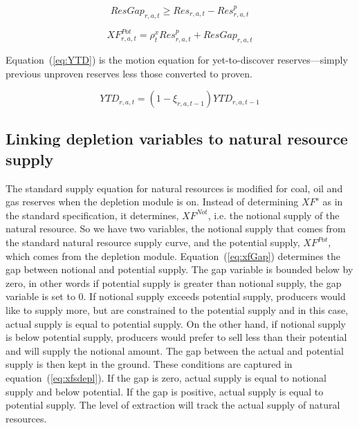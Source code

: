 \documentclass[11pt,letterpaper]{report}
\begin{document}
\begin{equation}
\label{eq:resGap}
\mathit{ResGap}_{r,a,t} \ge \mathit{Res}_{r,a,t} - \mathit{Res}^p_{r,a,t}
\end{equation}

\begin{equation}
\label{eq:xfPot}
\mathit{XF}^{\mathit{Pot}}_{r,a,t} = \rho^x_t \mathit{Res}^p_{r,a,t} + \mathit{ResGap}_{r,a,t}
\end{equation}

Equation~(\ref{eq:YTD}) is the motion equation for yet-to-discover
reserves---simply previous unproven reserves less those converted
to proven.

\begin{equation}
\label{eq:YTD}
\mathit{YTD}_{r,a,t} = \left( 1 - \xi_{r,a,t-1} \right) \mathit{YTD}_{r,a,t-1}
\end{equation}

\subsection{Linking depletion variables to natural resource supply}

The standard supply equation for natural resources
is modified for coal, oil and gas reserves when
the depletion module is on. Instead of determining
$\mathit{XF}^s$ as in the standard specification, it
determines, $\mathit{XF}^{\mathit{Not}}$, i.e. the notional
supply of the natural resource. So we have two variables,
the notional supply that comes from the standard natural resource
supply curve, and the potential supply, $\mathit{XF}^{\mathit{Pot}}$,
which comes from the depletion module.
Equation~(\ref{eq:xfGap}) determines the gap between notional
and potential supply. The gap variable is bounded below by zero, in
other words if potential supply is greater than notional supply,
the gap variable is set to 0.
If notional supply exceeds potential supply, producers would
like to supply more, but are constrained to the potential supply and
in this case, actual supply is equal to potential supply. On the
other hand, if notional supply is below potential supply, producers
would prefer to sell less than their potential and will
supply the notional amount. The gap between the actual and
potential supply is then kept in the ground. These
conditions are captured in equation~(\ref{eq:xfsdepl}). If
the gap is zero, actual supply is equal to notional supply
and below potential. If the gap is positive, actual supply is
equal to potential supply.
The level of extraction will track the actual supply of natural
resources.
\end{document}
